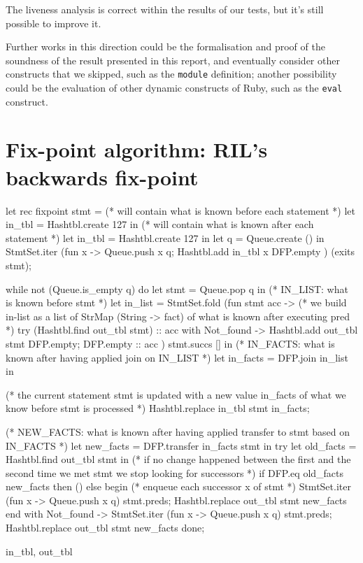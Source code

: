 \documentclass[a4paper]{article}   %
\begin{document}
The liveness analysis is correct within the results of our tests, but it's still possible to improve it.

Further works in this direction could be the formalisation and proof of the soundness of the result presented in this report, and eventually consider other constructs that we skipped, such as the \texttt{module} definition; another possibility could be the evaluation of other dynamic constructs of Ruby, such as the \texttt{eval} construct.
\pagebreak

\appendix
\section{Fix-point algorithm: RIL's backwards fix-point}
\label{RILfix}
\begin{ocaml}
let rec fixpoint stmt =
    (* will contain what is known before each statement *)
    let in_tbl = Hashtbl.create 127 in
    (* will contain what is known after each statement *)
    let in_tbl = Hashtbl.create 127 in
	let q = Queue.create () in
	StmtSet.iter
		(fun x ->
				Queue.push x q;
				Hashtbl.add in_tbl x DFP.empty
		) (exits stmt);
		
	while not (Queue.is_empty q) do
		let stmt = Queue.pop q in
		(* IN_LIST: what is known before stmt *)
		let in_list =
			StmtSet.fold
				(fun stmt acc ->
				(* we build in-list as a list of StrMap (String -> fact) of what is known after executing pred *)
							try (Hashtbl.find out_tbl stmt) :: acc
							with Not_found ->
    								Hashtbl.add out_tbl stmt DFP.empty;
    								DFP.empty :: acc
				) stmt.succs [] in
		(* IN_FACTS: what is known after having applied join on IN_LIST *)
		let in_facts = DFP.join in_list in
		
		(* the current statement stmt is updated with a new value in_facts of what we know before stmt is processed *)
		Hashtbl.replace in_tbl stmt in_facts;
		
		(* NEW_FACTS: what is known after having applied transfer to stmt based on IN_FACTS *)
		let new_facts = DFP.transfer in_facts stmt in
			try
				let old_facts = Hashtbl.find out_tbl stmt in
				(* if no change happened between the first and the second time we met stmt we stop looking for successors *)
				if DFP.eq old_facts new_facts
				then ()
				else begin
                    (* enqueue each successor x of stmt *)
					StmtSet.iter (fun x -> Queue.push x q) stmt.preds;
					Hashtbl.replace out_tbl stmt new_facts
				end
			with Not_found ->
					StmtSet.iter (fun x -> Queue.push x q) stmt.preds;
					Hashtbl.replace out_tbl stmt new_facts
	done;

	in_tbl, out_tbl

\end{ocaml}
\end{document}
